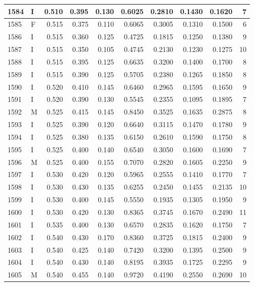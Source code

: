 \documentclass[9pt,twocolumn,twoside,]{pnas-new}
\begin{document}
\begin{tabular}{l|l|r|r|r|r|r|r|r|r}
\hline
1584 & I & 0.510 & 0.395 & 0.130 & 0.6025 & 0.2810 & 0.1430 & 0.1620 & 7\\
\hline
1585 & F & 0.515 & 0.375 & 0.110 & 0.6065 & 0.3005 & 0.1310 & 0.1500 & 6\\
\hline
1586 & I & 0.515 & 0.360 & 0.125 & 0.4725 & 0.1815 & 0.1250 & 0.1380 & 9\\
\hline
1587 & I & 0.515 & 0.350 & 0.105 & 0.4745 & 0.2130 & 0.1230 & 0.1275 & 10\\
\hline
1588 & I & 0.515 & 0.395 & 0.125 & 0.6635 & 0.3200 & 0.1400 & 0.1700 & 8\\
\hline
1589 & I & 0.515 & 0.390 & 0.125 & 0.5705 & 0.2380 & 0.1265 & 0.1850 & 8\\
\hline
1590 & I & 0.520 & 0.410 & 0.145 & 0.6460 & 0.2965 & 0.1595 & 0.1650 & 9\\
\hline
1591 & I & 0.520 & 0.390 & 0.130 & 0.5545 & 0.2355 & 0.1095 & 0.1895 & 7\\
\hline
1592 & M & 0.525 & 0.415 & 0.145 & 0.8450 & 0.3525 & 0.1635 & 0.2875 & 8\\
\hline
1593 & I & 0.525 & 0.390 & 0.120 & 0.6640 & 0.3115 & 0.1470 & 0.1780 & 9\\
\hline
1594 & I & 0.525 & 0.380 & 0.135 & 0.6150 & 0.2610 & 0.1590 & 0.1750 & 8\\
\hline
1595 & I & 0.525 & 0.400 & 0.140 & 0.6540 & 0.3050 & 0.1600 & 0.1690 & 7\\
\hline
1596 & M & 0.525 & 0.400 & 0.155 & 0.7070 & 0.2820 & 0.1605 & 0.2250 & 9\\
\hline
1597 & I & 0.530 & 0.420 & 0.120 & 0.5965 & 0.2555 & 0.1410 & 0.1770 & 7\\
\hline
1598 & I & 0.530 & 0.430 & 0.135 & 0.6255 & 0.2450 & 0.1455 & 0.2135 & 10\\
\hline
1599 & I & 0.530 & 0.400 & 0.145 & 0.5550 & 0.1935 & 0.1305 & 0.1950 & 9\\
\hline
1600 & I & 0.530 & 0.420 & 0.130 & 0.8365 & 0.3745 & 0.1670 & 0.2490 & 11\\
\hline
1601 & I & 0.535 & 0.400 & 0.130 & 0.6570 & 0.2835 & 0.1620 & 0.1750 & 7\\
\hline
1602 & I & 0.540 & 0.430 & 0.170 & 0.8360 & 0.3725 & 0.1815 & 0.2400 & 9\\
\hline
1603 & I & 0.540 & 0.425 & 0.140 & 0.7420 & 0.3200 & 0.1395 & 0.2500 & 9\\
\hline
1604 & I & 0.540 & 0.430 & 0.140 & 0.8195 & 0.3935 & 0.1725 & 0.2295 & 9\\
\hline
1605 & M & 0.540 & 0.455 & 0.140 & 0.9720 & 0.4190 & 0.2550 & 0.2690 & 10\\

\end{tabular}
\end{document}
